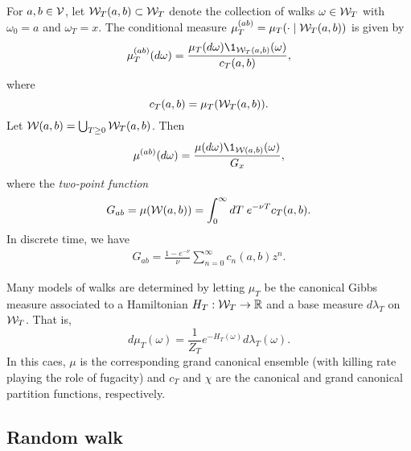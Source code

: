 For $a, b \in \mathcal{V}$, let $\mathcal{W}_T(a, b) \subset \mathcal{W}_T$ denote the collection of walks
$\omega \in \mathcal{W}_T$ with $\omega_0 = a$ and $\omega_T = x$.
The conditional measure $\mu^{(ab)}_T = \mu_T(\cdot \mid \mathcal{W}_T(a, b))$
is given by
\begin{equation}
\mu^{(ab)}_T(d\omega) = \frac{\mu_T(d\omega) \1_{\Wcal_T(a, b)}(\omega)}{c_T(a, b)},
\end{equation}
where
\begin{equation}
c_T(a, b) = \mu_T(\mathcal{W}_T(a, b)).
\end{equation}
Let $\mathcal{W}(a, b) = \bigcup_{T \ge 0} \mathcal{W}_T(a, b)$. Then
\begin{equation}
\mu^{(ab)}(d\omega) = \frac{\mu(d\omega) \1_{\Wcal(a, b)}(\omega)}{G_x},
\end{equation}
where the \emph{two-point function}
\begin{equation}
G_{ab} = \mu(\mathcal{W}(a, b)) = \int_0^\infty dT \; e^{-\nu T} c_T(a, b).
\end{equation}
In discrete time, we have
\begin{align}
G_{ab} = \frac{1 - e^{-\nu}}{\nu} \sum_{n=0}^\infty c_n(a, b) z^n.
\end{align}

Many models of walks are determined by letting $\mu_T$ be the canonical Gibbs measure
associated to a Hamiltonian $H_T : \mathcal{W}_T \rightarrow {\mathbb R}$ and a base measure $d\lambda_T$ on $\mathcal{W}_T$.
That is,
\begin{equation}
d\mu_T(\omega) = \frac{1}{Z_T} e^{-H_T(\omega)} d\lambda_T(\omega).
\end{equation}
In this caes, $\mu$ is the corresponding grand canonical ensemble (with killing rate playing
the role of fugacity) and $c_T$ and $\chi$
are the canonical and grand canonical partition functions, respectively.



\subsection{Random walk}


